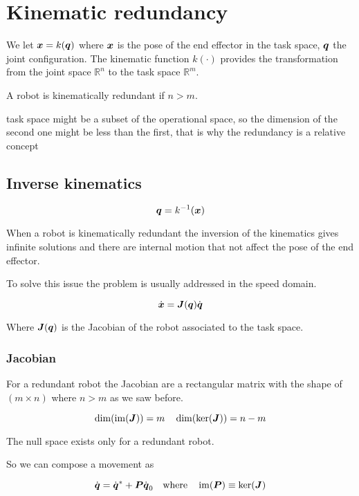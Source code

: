 \chapter{Kinematic redundancy}\label{ch:kinematic-redundancy}

We let $\boldsymbol{x}=k(\boldsymbol{q})$ where $\boldsymbol{x}$ is the pose of the end effector in the task space, $\boldsymbol{q}$ the joint configuration.
The kinematic function $k(\cdot)$ provides the transformation from the joint space $\mathbb{R}^n$ to the task space $\mathbb{R}^m$.

A robot is kinematically redundant if $n > m$.

\begin{nb}task space might be a subset of the operational space, so the dimension of the second one might be less than the first, that is why the redundancy is a relative concept\end{nb}

\section{Inverse kinematics}

\[ \boldsymbol{q}=k^{-1}(\boldsymbol{x}) \]

When a robot is kinematically redundant the inversion of the kinematics gives infinite solutions and there are internal motion that not affect the pose of the end effector.

To solve this issue the problem is usually addressed in the speed domain.

\begin{equation}
	\dot{\boldsymbol{x}} = \boldsymbol{J}(\boldsymbol{q}) \dot{\boldsymbol{q}}
	\label{eq:inverse-constraint}
\end{equation}

Where $\boldsymbol{J}(\boldsymbol{q})$ is the Jacobian of the robot associated to the task space.

\subsection{Jacobian}

For a redundant robot the Jacobian are a rectangular matrix with the shape of $(m \times n)$ where $n > m$ as we saw before.

\[ \dim(\operatorname{im}(\boldsymbol{J})) = m \quad \dim(\ker(\boldsymbol{J})) = n - m \]

The null space exists only for a redundant robot.

So we can compose a movement as

\[ \dot{\boldsymbol{q}} = \dot{\boldsymbol{q}}^* + \boldsymbol{P} \dot{\boldsymbol{q}}_0 \quad \text{where} \quad \operatorname{im}(\boldsymbol{P}) \equiv \ker(\boldsymbol{J}) \]

